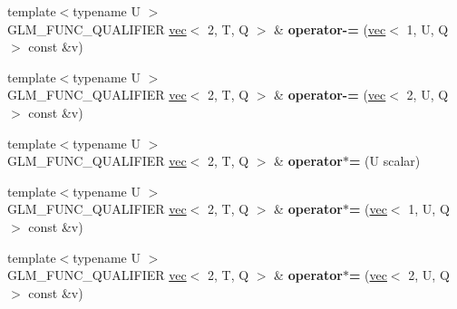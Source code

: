 \begin{DoxyCompactItemize}
\item 
\mbox{\label{structglm_1_1vec_3_012_00_01T_00_01Q_01_4_a567c2cbb4b73916d5d4ae45058074aea}} 
{\footnotesize template$<$typename U $>$ }\\G\+L\+M\+\_\+\+F\+U\+N\+C\+\_\+\+Q\+U\+A\+L\+I\+F\+I\+ER \hyperlink{structglm_1_1vec}{vec}$<$ 2, T, Q $>$ \& {\bfseries operator-\/=} (\hyperlink{structglm_1_1vec}{vec}$<$ 1, U, Q $>$ const \&v)
\item 
\mbox{\label{structglm_1_1vec_3_012_00_01T_00_01Q_01_4_ae73ba64842a46d90b3e6a61df288f70d}} 
{\footnotesize template$<$typename U $>$ }\\G\+L\+M\+\_\+\+F\+U\+N\+C\+\_\+\+Q\+U\+A\+L\+I\+F\+I\+ER \hyperlink{structglm_1_1vec}{vec}$<$ 2, T, Q $>$ \& {\bfseries operator-\/=} (\hyperlink{structglm_1_1vec}{vec}$<$ 2, U, Q $>$ const \&v)
\item 
\mbox{\label{structglm_1_1vec_3_012_00_01T_00_01Q_01_4_ad360d1fd9201d64bc34e5357e59d69ec}} 
{\footnotesize template$<$typename U $>$ }\\G\+L\+M\+\_\+\+F\+U\+N\+C\+\_\+\+Q\+U\+A\+L\+I\+F\+I\+ER \hyperlink{structglm_1_1vec}{vec}$<$ 2, T, Q $>$ \& {\bfseries operator$\ast$=} (U scalar)
\item 
\mbox{\label{structglm_1_1vec_3_012_00_01T_00_01Q_01_4_ab1148ae3c3b8be0f46dd17ba8447ee55}} 
{\footnotesize template$<$typename U $>$ }\\G\+L\+M\+\_\+\+F\+U\+N\+C\+\_\+\+Q\+U\+A\+L\+I\+F\+I\+ER \hyperlink{structglm_1_1vec}{vec}$<$ 2, T, Q $>$ \& {\bfseries operator$\ast$=} (\hyperlink{structglm_1_1vec}{vec}$<$ 1, U, Q $>$ const \&v)
\item 
\mbox{\label{structglm_1_1vec_3_012_00_01T_00_01Q_01_4_a4f386a696770fd88224391b4d41f14e3}} 
{\footnotesize template$<$typename U $>$ }\\G\+L\+M\+\_\+\+F\+U\+N\+C\+\_\+\+Q\+U\+A\+L\+I\+F\+I\+ER \hyperlink{structglm_1_1vec}{vec}$<$ 2, T, Q $>$ \& {\bfseries operator$\ast$=} (\hyperlink{structglm_1_1vec}{vec}$<$ 2, U, Q $>$ const \&v)
\item 
\mbox{\label{structglm_1_1vec_3_012_00_01T_00_01Q_01_4_aa079256ad1b556250e46558103a984e8}} 

\end{DoxyCompactItemize}
